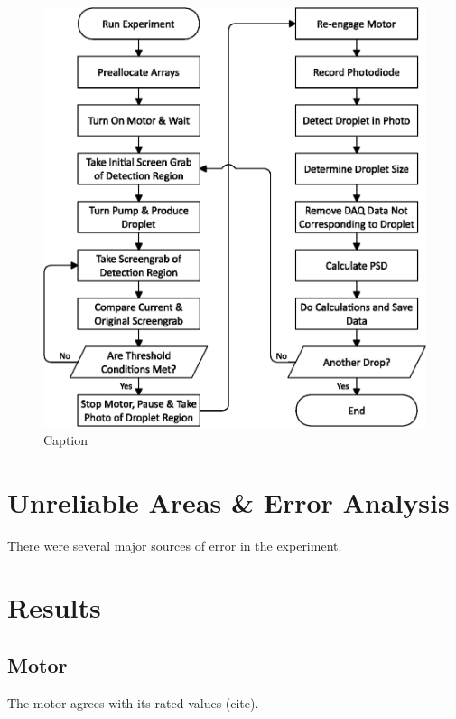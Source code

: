 \documentclass{physics_article_B}
\begin{document}
        \newpage
        \begin{figure}[H]
            \centering
            \hspace*{-1cm}\includegraphics[scale=0.8]{Figures/FlowLogic.eps}
            \caption{Caption}
            \label{fig:setup:logic}
        \end{figure}

\section{Unreliable Areas \& Error Analysis} 
    
    There were several major sources of error in the experiment.
    
\section{Results}
    
    \subsection{Motor}
    
        The motor agrees with its rated values (cite).
    
\end{document}
